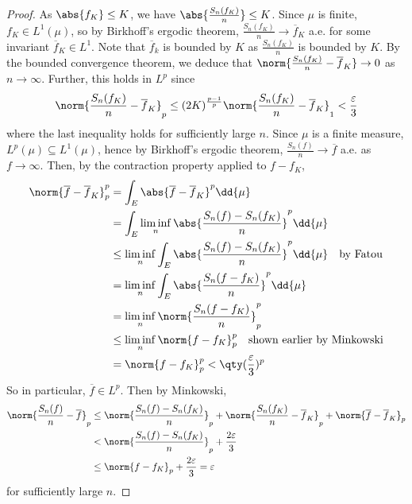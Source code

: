 \begin{proof}
	As $\abs{f_K} \leq K$, we have $\abs{\frac{S_n(f_K)}{n}} \leq K$.
	Since $\mu$ is finite, $f_K \in L^1(\mu)$, so by Birkhoff's ergodic theorem, $\frac{S_n(f_K)}{n} \to \overline f_K$ a.e. for some invariant $\overline f_K \in L^1$.
	Note that $\overline f_k$ is bounded by $K$ as $\frac{S_n(f_K)}{n}$ is bounded by $K$.
	By the bounded convergence theorem, we deduce that $\norm{\frac{S_n(f_K)}{n} - \overline f_K} \to 0$ as $n \to \infty$.
	Further, this holds in $L^p$ since
	\begin{align*}
        \norm{\frac{S_n(f_K)}{n} - \overline f_K}_p \leq (2K)^{\frac{p-1}{p}} \norm{\frac{S_n(f_K)}{n} - \overline f_K}_1 < \frac{\varepsilon}{3}
    \end{align*}
	where the last inequality holds for sufficiently large $n$.
	Since $\mu$ is a finite measure, $L^p(\mu) \subseteq L^1(\mu)$, hence by Birkhoff's ergodic theorem, $\frac{S_n(f)}{n} \to \overline f$ a.e. as $f \to \infty$.
	Then, by the contraction property applied to $f - f_K$,
	\begin{align*}
		\norm{\overline f - \overline f_K}_p^p &= \int_E \abs{\overline f - \overline f_K}^p \dd{\mu} \\
		&= \int_E \liminf_n \abs{\frac{S_n(f) - S_n(f_K)}{n}}^p \dd{\mu} \\
		&\leq \liminf_n \int_E \abs{\frac{S_n(f) - S_n(f_K)}{n}}^p \dd{\mu} \quad \text{by Fatou} \\
		&= \liminf_n \int_E \abs{\frac{S_n(f - f_K)}{n}}^p \dd{\mu} \\
		&= \liminf_n \norm{\frac{S_n(f - f_K)}{n}}_p^p \\
		&\leq \liminf_n \norm{f - f_K}_p^p \quad \text{shown earlier by Minkowski}\\
		&= \norm{f - f_K}_p^p < \qty(\frac{\varepsilon}{3})^p
	\end{align*}
	So in particular, $\overline f \in L^p$.
	Then by Minkowski,
	\begin{align*}
			\norm{\frac{S_n(f)}{n} - \overline f}_p &\leq \norm{\frac{S_n(f) - S_n(f_K)}{n}}_p + \norm{\frac{S_n(f_K)}{n} - \overline f_K}_p + \norm{\overline f - \overline f_K}_p \\
			&< \norm{\frac{S_n(f) - S_n(f_K)}{n}}_p + \frac{2\varepsilon}{3} \\
			&\leq \norm{f - f_K}_p + \frac{2\varepsilon}{3} = \varepsilon
	\end{align*}
	for sufficiently large $n$.
\end{proof}

